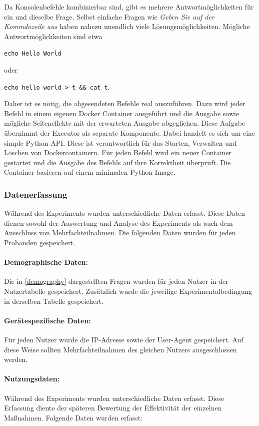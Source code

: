   Da Konsolenbefehle kombinierbar sind, gibt es mehrere Antwortmöglichkeiten für ein und dieselbe Frage. Selbst einfache Fragen wie \textit{Geben Sie  auf der Kommdozeile aus} haben nahezu unendlich viele Lösungsmöglichkeiten. Mögliche Antwortmöglichkeiten sind etwa 
  \begin{center}
      \verb|echo Hello World|
  \end{center}
  oder 
   \begin{center}
      \verb|echo hello world > t && cat t|.
  \end{center}
  Daher ist es nötig, die abgesendeten Befehle real auszuführen. Dazu wird jeder Befehl in einem eigenen Docker Container ausgeführt und die Ausgabe sowie mögliche Seiteneffekte mit der erwarteten Ausgabe abgeglichen. Diese Aufgabe übernimmt der Executor als separate Komponente. Dabei handelt es sich um eine simple Python API. Diese ist verantwortlich für das Starten, Verwalten und Löschen von Dockercontainern. Für jeden Befehl wird ein neuer Container gestartet und die Ausgabe des Befehls auf ihre Korrektheit überprüft. Die Container basieren auf einem minimalen Python Image. 


\subsubsection{Datenerfassung}
Während des Experiments wurden unterschiedliche Daten erfasst. Diese Daten dienen sowohl der Auswertung und Analyse des Experiments als auch dem Ausschluss von Mehrfachteilnahmen. Die folgenden Daten wurden für jeden Probanden gespeichert.

\paragraph{Demographische Daten:}
Die in \ref{demography} dargestellten Fragen wurden für jeden Nutzer in der Nutzertabelle gespeichert. Zusätzlich wurde die jeweilige Experimentalbedingung in derselben Tabelle gespeichert.

\paragraph{Gerätespezifische Daten:}
Für jeden Nutzer wurde die IP-Adresse sowie der User-Agent gespeichert. Auf diese Weise sollten Mehrfachteilnahmen des gleichen Nutzers ausgeschlossen werden.

\paragraph{Nutzungsdaten:}
Während des Experiments wurden unterschiedliche Daten erfasst. Diese Erfassung diente der späteren Bewertung der Effektivität der einzelnen Maßnahmen. Folgende Daten wurden erfasst:

